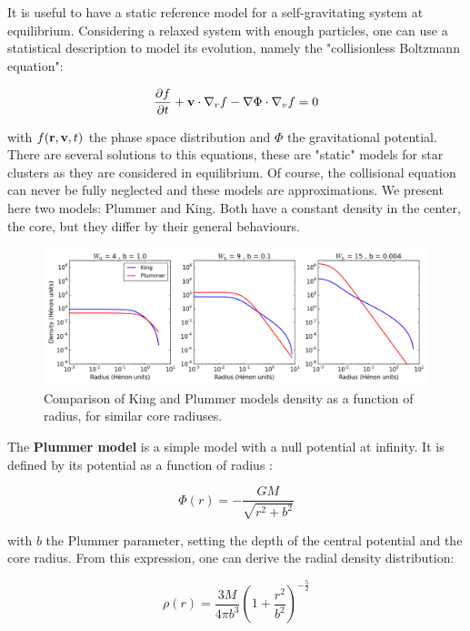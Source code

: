 It is useful to have a static reference model for a self-gravitating system at equilibrium. Considering a relaxed system with enough particles, one can use a statistical description to model its evolution, namely the "collisionless Boltzmann equation":

\begin{equation}
\frac{\partial f}{\partial t} + \bold{v} \cdot \nabla_r f - \nabla \Phi \cdot \nabla_v f = 0
\end{equation}

with $f(\bold{r},\bold{v},t)$ the phase space distribution and $\Phi$ the gravitational potential. There are several solutions to this equations, these are "static" models for star clusters as they are considered in equilibrium. Of course, the collisional equation can never be fully neglected and these models are approximations. We present here two models: Plummer and King. Both have a constant density in the center, the core, but they differ by their general behaviours. 


\begin{figure}
\center
\includegraphics[width=0.95\linewidth]{Figures/0_kingplummer.png}
\caption{Comparison of King and Plummer models density as a function of radius, for similar core radiuses.}
\label{Fig:0_plummerking}
\end{figure}


The \textbf{Plummer model} is a simple model with a null potential at infinity. It is defined by its potential as a function of radius \citep{BT}:

\begin{equation}
\Phi(r) = - \frac{G M}{\sqrt{r^2 + b^2}}
\end{equation}

with $b$ the Plummer parameter, setting the depth of the central potential and the core radius. From this expression, one can derive the radial density distribution:

\begin{equation}
\label{Eq:0_plummerrho}
\rho(r) = \frac{3 M}{4 \pi b^3} \left( 1 + \frac{r^2}{b^2} \right) ^{- \frac{5}{2}}
\end{equation}

